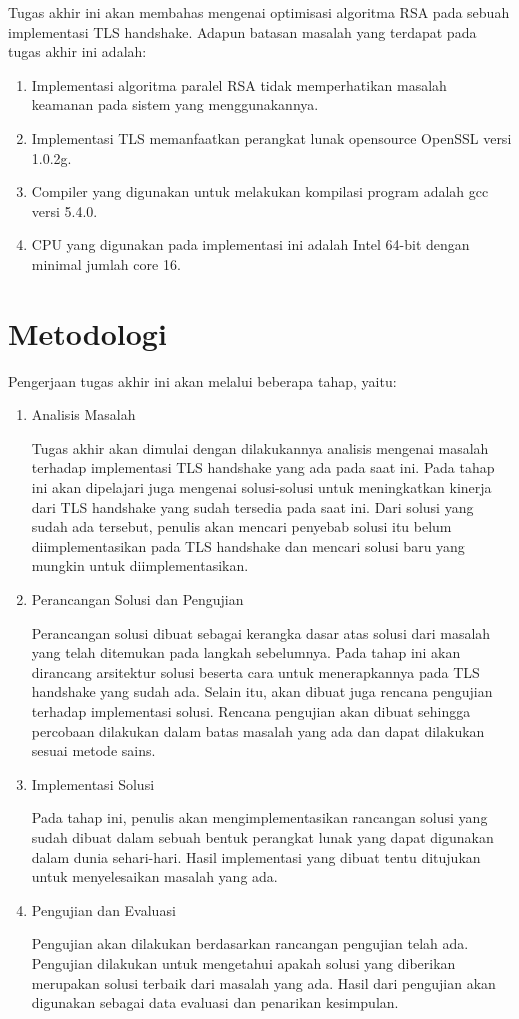 Tugas akhir ini akan membahas mengenai optimisasi algoritma RSA pada sebuah implementasi TLS handshake. Adapun batasan masalah yang terdapat pada tugas akhir ini adalah:

\begin{enumerate}
  \item Implementasi algoritma paralel RSA tidak memperhatikan masalah keamanan pada sistem yang menggunakannya.
  \item Implementasi TLS memanfaatkan perangkat lunak opensource OpenSSL versi 1.0.2g.
  \item Compiler yang digunakan untuk melakukan kompilasi program adalah gcc versi 5.4.0.
  \item CPU yang digunakan pada implementasi ini adalah Intel 64-bit dengan minimal jumlah core 16.
\end{enumerate}

\section{Metodologi}

Pengerjaan tugas akhir ini akan melalui beberapa tahap, yaitu:
\begin{enumerate}
  \item Analisis Masalah

  Tugas akhir akan dimulai dengan dilakukannya analisis mengenai masalah terhadap implementasi TLS handshake yang ada pada saat ini. Pada tahap ini akan dipelajari juga mengenai solusi-solusi untuk meningkatkan kinerja dari TLS handshake yang sudah tersedia pada saat ini. Dari solusi yang sudah ada tersebut, penulis akan mencari penyebab solusi itu belum diimplementasikan pada TLS handshake dan mencari solusi baru yang mungkin untuk diimplementasikan.

  \item Perancangan Solusi dan Pengujian

  Perancangan solusi dibuat sebagai kerangka dasar atas solusi dari masalah yang telah ditemukan pada langkah sebelumnya. Pada tahap ini akan dirancang arsitektur solusi beserta cara untuk menerapkannya pada TLS handshake yang sudah ada. Selain itu, akan dibuat juga rencana pengujian terhadap implementasi solusi. Rencana pengujian akan dibuat sehingga percobaan dilakukan dalam batas masalah yang ada dan dapat dilakukan sesuai metode sains.

  \item Implementasi Solusi

  Pada tahap ini, penulis akan mengimplementasikan rancangan solusi yang sudah dibuat dalam sebuah bentuk perangkat lunak yang dapat digunakan dalam dunia sehari-hari. Hasil implementasi yang dibuat tentu ditujukan untuk menyelesaikan masalah yang ada.

  \item Pengujian dan Evaluasi

  Pengujian akan dilakukan berdasarkan rancangan pengujian telah ada. Pengujian dilakukan untuk mengetahui apakah solusi yang diberikan merupakan solusi terbaik dari masalah yang ada. Hasil dari pengujian akan digunakan sebagai data evaluasi dan penarikan kesimpulan.

\end{enumerate}


